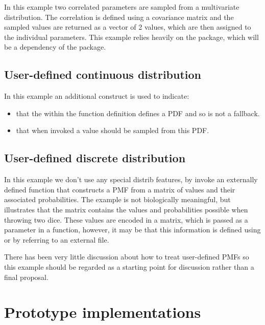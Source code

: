 \documentclass[draftspec]{sbmlpkgspec}
\begin{document}
In this example two correlated parameters are sampled from a
multivariate distribution. The correlation is defined using a
covariance matrix and the sampled values are returned as a vector of 2
values, which are then assigned to the individual parameters. This
example relies heavily on the \arraysshort package, which will be a
dependency of the \distribshort package.


\subsection{User-defined continuous distribution }

In this example an additional construct is used to indicate:
\begin{itemize}
\item that the \mathml within the function definition defines a PDF and so is not a
fallback.
\item that when invoked a value should be sampled from this PDF.
\end{itemize}



\subsection{User-defined discrete distribution}
\label{sec:userDefinedDiscrete}

In this example we don't use any special distrib features, by invoke
an externally defined function that constructs a PMF from a matrix of
values and their associated probabilities. The example is not
biologically meaningful, but illustrates that the matrix contains the
values and probabilities possible when throwing two dice. These values
are encoded in a matrix, which is passed as a parameter in a function,
however, it may be that this information is defined using
\numl\contraversial or by referring to an external file.

There has been very little discussion\contraversial{} about how to treat user-defined
PMFs so this example should be regarded as a starting point for
discussion rather than a final proposal.


\section{Prototype implementations}
\end{document}
